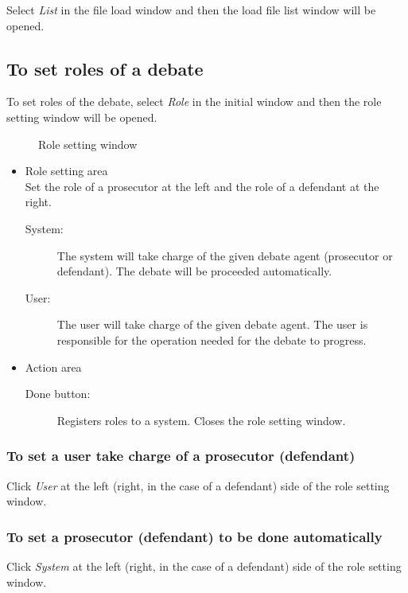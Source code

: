 Select {\sl List} in the file load window and then the load file list window will be opened.

\subsection{To set roles of a debate}\label{To set roles of a debate}

To set roles of the debate, select {\sl Role} in the initial window and then the role setting window will be opened.

\begin{figure}[htb]
\begin{center}
\end{center}
\caption{Role setting window}\label{Role setting window}
\end{figure}

\begin{itemize}
\item Role setting area \\
Set the role of a prosecutor at the left and the role of a defendant at the right.
\begin{description}
\item[System:] The system will take charge of the given debate agent (prosecutor or defendant).  The debate will be proceeded automatically.
\item[User:] The user will take charge of the given debate agent.  The user is responsible for the operation needed for the debate to progress.
\end{description}

\item Action area
\begin{description}
\item[Done button:] Registers roles to a system.
Closes the role setting window.

\end{description}

\end{itemize}

\subsubsection{To set a user take charge of a prosecutor (defendant)}
Click {\sl User} at the left (right, in the case of a defendant) side of the role setting window.

\subsubsection{To set a prosecutor (defendant) to be done automatically}
Click {\sl System} at the left (right, in the case of a defendant) side of the role setting window.


